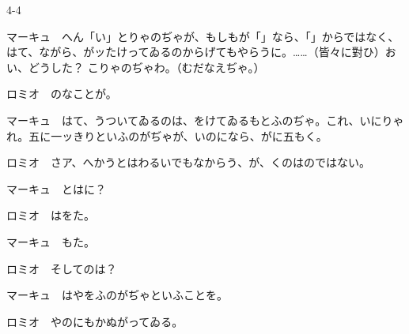 \documentclass[tate,paper=b6j,jafontsize=9pt]{jlreq}
\begin{document}
\begin{azconvIndented}{4\zw}{-4\zw}

マーキュ　へん「い」とりゃのぢゃが、もしもが「」なら、「」からではなく、はて、ながら、がッたけってゐるのからげてもやらうに。……（皆々に對ひ）おい、どうした？ こりゃのぢゃわ。（むだなえぢゃ。）

ロミオ　のなことが。

マーキュ　はて、うついてゐるのは、をけてゐるもとふのぢゃ。これ、いにりゃれ。五に一ッきりといふのがぢゃが、いのになら、がに五もく。

ロミオ　さア、へかうとはわるいでもなからう、が、くのはのではない。

マーキュ　とはに？

ロミオ　はをた。

マーキュ　もた。

ロミオ　そしてのは？

マーキュ　はやをふのがぢゃといふことを。

ロミオ　やのにもかぬがってゐる。


\end{azconvIndented}
\end{document}
